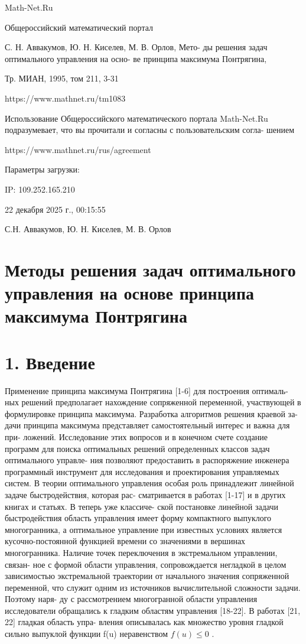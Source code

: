 \documentclass[10pt]{article}
\begin{document}
Math-Net.Ru

Общероссийский математический портал

С. Н. Аввакумов, Ю. Н. Киселев, М. В. Орлов, Мето- ды решения задач оптимального управления на осно- ве принципа максимума Понтрягина,

Тр. МИАН, 1995, том 211, 3-31

https://www.mathnet.ru/tm1083

Использование Общероссийского математического портала Math-Net.Ru подразумевает, что вы прочитали и согласны с пользовательским согла- шением

https://www.mathnet.ru/rus/agreement

Параметры загрузки:

IP: 109.252.165.210

22 декабря 2025 г., 00:15:55

С.Н. Аввакумов, Ю. Н. Киселев, М. В. Орлов

\section*{Методы решения задач оптимального управления на основе принципа максимума Понтрягина}

\section*{1. Введение}

Применение принципа максимума Понтрягина [1-6] для построения оптималь- ных решений предполагает нахождение сопряженной переменной, участвующей в формулировке принципа максимума. Разработка алгоритмов решения краевой за- дачи принципа максимума представляет самостоятельный интерес и важна для при- ложений. Исследование этих вопросов и в конечном счете создание программ для поиска оптимальных решений определенных классов задач оптимального управле- ния позволяют предоставить в распоряжение инженера программный инструмент для исследования и проектирования управляемых систем. В теории оптимального управления особая роль принадлежит линейной задаче быстродействия, которая рас- сматривается в работах [1-17] и в других книгах и статьях. В теперь уже классиче- ской постановке линейной задачи быстродействия область управления имеет форму компактного выпуклого многогранника, а оптимальное управление при известных условиях является кусочно-постоянной функцией времени со значениями в вершинах многогранника. Наличие точек переключения в экстремальном управлении, связан- ное с формой области управления, сопровождается негладкой в целом зависимостью экстремальной траектории от начального значения сопряженной переменной, что служит одним из источников вычислительной сложности задачи. Поэтому наря- ду с рассмотрением многогранной области управления исследователи обращались к гладким областям управления [18-22]. В работах [21, 22] гладкая область упра- вления описывалась как множество уровня гладкой сильно выпуклой функции f(u) неравенством \(f\left( u\right)  \leq  0\) .
\end{document}
